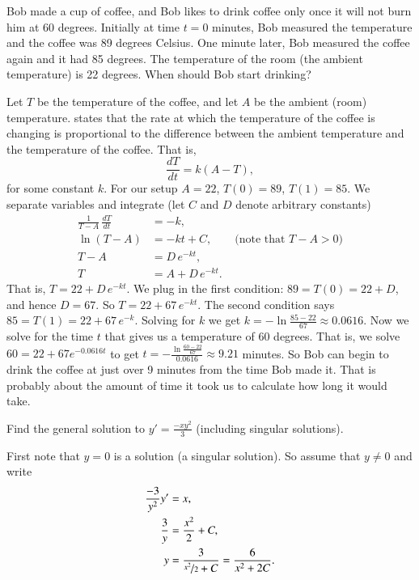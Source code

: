 \documentclass[12pt]{book}
\begin{document}
\begin{example} \label{sep:coffeeexample}
Bob made a cup of coffee, and
Bob likes to drink coffee only once it will not burn him at 60
degrees.
Initially at time $t=0$ minutes,
Bob measured the temperature and the coffee was 89 degrees Celsius.
One minute later, Bob measured the coffee again and it had 85 degrees.
The temperature of the room (the ambient temperature) is 22 degrees.
When should Bob start drinking?

Let $T$ be the temperature of the coffee, and let $A$ be the ambient (room) temperature.
 states that the rate at which the
temperature of the coffee is changing
is proportional to the difference between the
ambient temperature and the temperature of the coffee.  That is,
\begin{equation*}
\frac{dT}{dt} = k(A-T) ,
\end{equation*}
for some constant $k$.
For our setup $A=22$, $T(0) = 89$, $T(1) = 85$.
We separate variables and integrate (let $C$ and $D$ denote arbitrary
constants)
\begin{align*}
\frac{1}{T-A} \, \frac{dT}{dt} & = -k , \\
\ln (T-A) &= -kt + C , \qquad \text{(note that } T-A > 0 \text{)} \\
T-A &= D\, e^{-kt} ,  \\
T &= A + D\, e^{-kt} .
\end{align*}
That is,
$T = 22 + D\, e^{-kt}$.  We plug in the first condition: $89 = T(0) = 22 +
D$,
and hence $D = 67$.  So
$T = 22 + 67\, e^{-kt}$.  The second condition says $85 = T(1) = 
22 + 67\, e^{-k}$.  Solving for $k$ we get
$k = - \ln \frac{85-22}{67} \approx 0.0616$.  Now we solve for the time $t$
that gives us a temperature of 60 degrees.  That is, we solve
$60 = 22 + 67 e^{-0.0616t}$ to get
$t = - \frac{\ln \frac{60-22}{67}}{0.0616} \approx 9.21$ minutes.  So Bob can
begin to drink the coffee at just over 9 minutes from the time Bob made
it.  That is probably about the amount of time it took us to calculate how long
it would take.
\end{example}

\begin{example}
Find the general solution to $y' = \frac{-xy^2}{3}$ (including singular
solutions).

First note that $y=0$ is a solution (a singular solution).
So assume that $y \not= 0$ and write
\begin{align*}
\frac{-3}{y^2} y' & = x , \\
\frac{3}{y} & = \frac{x^2}{2} + C , \\
y & = \frac{3}{\nicefrac{x^2}{2} + C}
= \frac{6}{x^2 + 2C}.
\end{align*}
\end{example}
\end{document}
